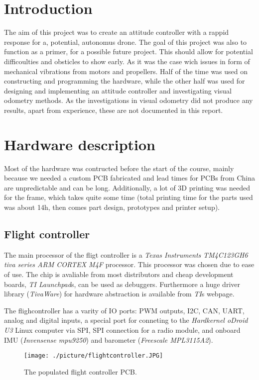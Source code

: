 


\newpage

\section{ Introduction }
The aim of this project was to create an attitude controller with a rappid response for a, potential, autonomus drone.
The goal of this project was also to function as a primer, for a possible future project. This should allow for potential difficoulties and obsticles to show early. As it was the case wich issues in form of mechanical vibrations from motors and propellers.
Half of the time was used on constructing and programming the hardware, while the other half was used for designing and implementing an attitude controller and investigating visual odometry methods.
As the investigations in visual odometry did not produce any results, apart from experience, these are not documented in this report.



\section{Hardware description}
Most of the hardware was contructed before the start of the course, mainly
because we needed a custom PCB fabricated and lead times for PCBs from China are
unpredictable and can be long.
Additionally, a lot of 3D printing was needed for the frame, which takes quite
some time (total printing time for the parts used was about 14h, then comes
part design, prototypes and printer setup).

\subsection{ Flight controller }
The main processor of the fligt controller is a \emph{Texas
Instruments} \emph{TM4C123GH6 tiva series ARM CORTEX M4F} processor.
This processor was chosen due to ease of use.
The chip is avaliable from most distributors and cheap development boards,
\emph{TI Launchpad}s, can be used as debuggers. Furthermore a huge driver
library (\emph{TivaWare}) for hardware abstraction is available from \emph{TI}s
webpage.

The flighcontroller has a varity of IO ports: PWM outputs, I2C, CAN, UART,
analog and digital inputs, a special port for conneting to the \emph{Hardkernel
oDroid U3} Linux computer via SPI, SPI connection for a radio module, and
onboard IMU (\emph{Invensense mpu9250}) and barometer (\emph{Freescale
MPL3115A2}).
\begin{figure}
	\centering
	\texttt{[image: ./picture/flightcontroller.JPG]}
	\caption{The populated flight controller PCB.}
	\label{fig:flightcontroller}
\end{figure}

